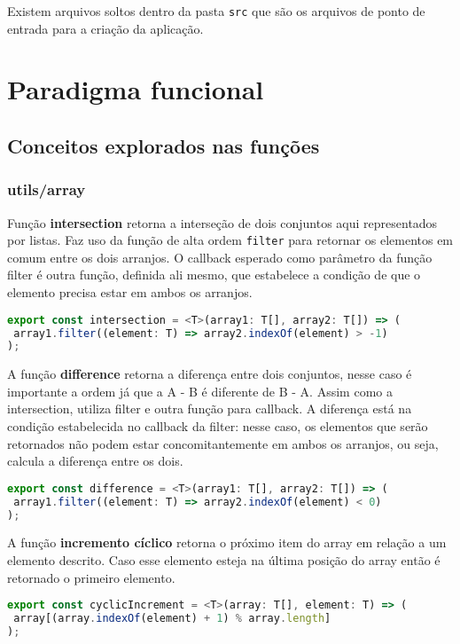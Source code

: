 \documentclass[rel_mlp]{iiufrgs}
\begin{document}
\par Existem arquivos soltos dentro da pasta \verb|src| que são os arquivos de ponto de entrada para a criação da aplicação.



\section{Paradigma funcional}

\subsection{Conceitos explorados nas funções}
\subsubsection{utils/array}

Função \textbf{intersection} retorna a interseção de dois conjuntos aqui representados por listas. Faz uso da função de alta ordem \verb|filter| para retornar os elementos em comum entre os dois arranjos. O callback esperado como parâmetro da função filter é outra função, definida ali mesmo, que estabelece a condição de que o elemento precisa estar em ambos os arranjos.
\begin{lstlisting}[language = JavaScript]
export const intersection = <T>(array1: T[], array2: T[]) => (
 array1.filter((element: T) => array2.indexOf(element) > -1)
);
\end{lstlisting}


A função \textbf{difference} retorna a diferença entre dois conjuntos, nesse caso é importante a ordem já que a A - B é diferente de B - A. Assim como a intersection, utiliza filter e outra função para callback. A diferença está na condição estabelecida no callback da filter: nesse caso, os elementos que serão retornados não podem estar concomitantemente em ambos os arranjos, ou seja, calcula a diferença entre os dois.
\begin{lstlisting}[language = JavaScript]
export const difference = <T>(array1: T[], array2: T[]) => (
 array1.filter((element: T) => array2.indexOf(element) < 0)
);
\end{lstlisting}

A função \textbf{incremento cíclico} retorna o próximo item do array em relação a um elemento descrito. Caso esse elemento esteja na última posição do array então é retornado o primeiro elemento.
\begin{lstlisting}[language = JavaScript]
export const cyclicIncrement = <T>(array: T[], element: T) => (
 array[(array.indexOf(element) + 1) % array.length]
);
\end{lstlisting}
\end{document}
